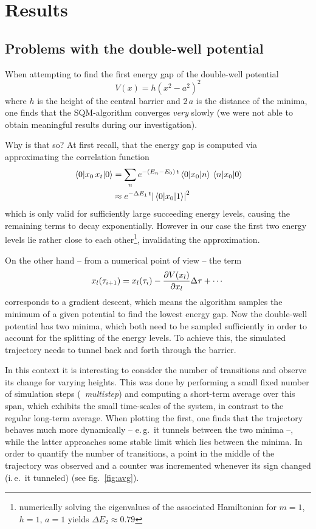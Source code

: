 \documentclass[11pt,a4paper]{scrartcl}
\newcommand*{\figref}[1]{(see fig.~\ref{#1})}
\newcommand{\eg}{e.\,g.}
\newcommand{\ie}{i.\,e.}
\begin{document}
\newpage



\section{Results}
\subsection{Problems with the double-well potential}
When attempting to find the first energy gap of the double-well potential
\begin{equation}
    V(x)=h\left(x^2-a^2\right)^2
    \label{eq:double-well}
\end{equation}
where $h$ is the height of the central barrier and $2\,a$ is the distance of the
minima, one finds that the SQM-algorithm converges \emph{very} slowly (we were not
able to obtain meaningful results during our investigation).

Why is that so? At first recall, that the energy gap is computed via
approximating the correlation function
\begin{align*}
    \ev{x_0\,x_t}{0}&=\sum_{n}e^{-(E_n-E_0)\,t}\mel{0}{x_0}{n}\mel{n}{x_0}{0}
    \\&\approx{e^{-\Delta{E_1}\,t}}\abs{\mel{0}{x_0}{1}}^2
\end{align*}
which is only valid for sufficiently large succeeding energy levels, causing
the remaining terms to decay exponentially. However in our case the first two
energy levels lie rather close to each other\footnote{numerically solving the
eigenvalues of the associated Hamiltonian for $m=1$, $h=1$, $a=1$ yields
$\Delta{E_2}\approx0.79$}, invalidating the approximation.

On the other hand -- from a numerical point of view -- the term
\begin{equation*}
    x_l(\tau_{i+1})=x_l(\tau_i)-\pdv{V(x_l)}{x_l}\Delta\tau+\dotsb
\end{equation*}
corresponds to a gradient descent, which means the algorithm samples the
minimum of a given potential to find the lowest energy gap. Now the double-well
potential has two minima, which both need to be sampled sufficiently in order
to account for the splitting of the energy levels. To achieve this, the
simulated trajectory needs to tunnel back and forth through the barrier.

In this context it is interesting to consider the number of transitions and
observe its change for varying heights. This was done by performing a small
fixed number of simulation steps (\textrightarrow~\emph{multistep}) and
computing a short-term average over this span, which exhibits the small
time-scales of the system, in contrast to the regular long-term average. When
plotting the first, one finds that the trajectory behaves much more dynamically
-- \eg~it tunnels between the two minima --, while the latter approaches some
stable limit which lies between the minima. In order to quantify the number of
transitions, a point in the middle of the trajectory was observed and a
counter was incremented whenever its sign changed (\ie~it tunneled)
\figref{fig:avg}.
\end{document}
